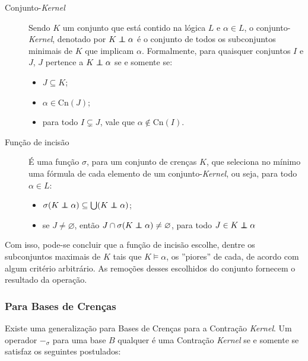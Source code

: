 \begin{description}
	\item[Conjunto-\textit{Kernel}] Sendo $ K $ um conjunto que está contido na lógica $ L $ e $ \alpha \in L $, o conjunto-\textit{Kernel}, denotado por $ K \kcont \alpha $ é o conjunto de todos os subconjuntos minimais de $ K $ que implicam $ \alpha $. Formalmente, para quaisquer conjuntos $ I $ e $ J $, $ J $ pertence a $ K \kcont \alpha $ se e somente se:
	\begin{itemize}
		\item $ J \subseteq K $;
		\item $ \alpha \in \text{Cn}(J) $;
		\item para todo $ I \subsetneq J $, vale que $ \alpha \notin \text{Cn}(I) $.
	\end{itemize} 	
	\item[Função de incisão] É uma função $ \sigma $, para um conjunto de crenças $ K $, que seleciona no mínimo uma fórmula de cada elemento de um conjunto-\textit{Kernel}, ou seja, para todo $ \alpha \in L $:
	\begin{itemize}
		\item $ \sigma (K \kcont \alpha) \subseteq \bigcup(K \kcont \alpha) $;
		\item se $ J \neq \varnothing $, então $ J \cap \sigma(K \kcont \alpha) \neq \varnothing $, para todo $ J \in K \kcont \alpha $
	\end{itemize}
\end{description}

Com isso, pode-se concluir que a função de incisão escolhe, dentre os subconjuntos maximais de $ K $ tais que $ K \models \alpha $, os ''piores'' de cada, de acordo com algum critério arbitrário. As remoções desses escolhidos do conjunto fornecem o resultado da operação.

\subsubsection{Para Bases de Crenças}

Existe uma generalização para Bases de Crenças para a Contração \textit{Kernel}. Um operador $ -_{\sigma} $ para uma base $ B $ qualquer é uma Contração \textit{Kernel} se e somente se satisfaz os seguintes postulados:


